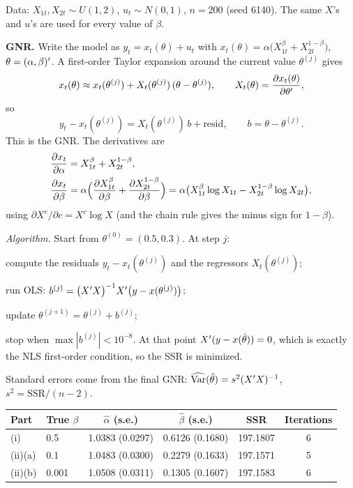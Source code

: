 \documentclass[11pt]{article}
\begin{document}

Data: $X_{1t},X_{2t}\sim U(1,2)$, $u_t\sim N(0,1)$, $n=200$ (seed 6140).
The same $X$'s and $u$'s are used for every value of $\beta$.

\textbf{GNR.} Write the model as $y_t=x_t(\theta)+u_t$ with $x_t(\theta)=\alpha\bigl(X_{1t}^{\beta}+X_{2t}^{1-\beta}\bigr)$,
$\theta=(\alpha,\beta)^{\prime}$. A first-order Taylor expansion around the current value $\theta^{(j)}$ gives
\[
  x_t(\theta)\approx x_t(\theta^{(j)})+X_t(\theta^{(j)})\,(\theta-\theta^{(j)}),
  \qquad X_t(\theta)=\frac{\partial x_t(\theta)}{\partial\theta^{\prime}},
\]
so
\[
  y_t-x_t(\theta^{(j)})=X_t(\theta^{(j)})\,b+\text{resid},\qquad b=\theta-\theta^{(j)} .
\]
This is the GNR. The derivatives are
\begin{align*}
  \frac{\partial x_t}{\partial\alpha}&=X_{1t}^{\beta}+X_{2t}^{1-\beta},\\
  \frac{\partial x_t}{\partial\beta}&=\alpha\Bigl(\frac{\partial X_{1t}^{\beta}}{\partial\beta}+\frac{\partial X_{2t}^{1-\beta}}{\partial\beta}\Bigr)
  =\alpha\bigl(X_{1t}^{\beta}\log X_{1t}-X_{2t}^{1-\beta}\log X_{2t}\bigr),
\end{align*}
using $\partial X^{c}/\partial c=X^{c}\log X$ (and the chain rule gives the minus sign for $1-\beta$).

\emph{Algorithm.} Start from $\theta^{(0)}=(0.5,0.3)$. At step $j$:
\begin{flatnum}
  \item compute the residuals $y_t-x_t(\theta^{(j)})$ and the regressors $X_t(\theta^{(j)})$;
  \item run OLS: $b^{(j)}=\bigl(X^{\prime} X\bigr)^{-1}X^{\prime}\bigl(y-x(\theta^{(j)})\bigr)$;
  \item update $\theta^{(j+1)}=\theta^{(j)}+b^{(j)}$;
  \item stop when $\max|b^{(j)}|<10^{-8}$. At that point $X^{\prime}(y-x(\hat\theta))=0$, which is exactly the
        NLS first-order condition, so the SSR is minimized.
\end{flatnum}
Standard errors come from the final GNR: $\widehat{\operatorname{Var}}(\hat\theta)=s^2(X^{\prime} X)^{-1}$, $s^2=\text{SSR}/(n-2)$.

\begin{center}
\begin{tabular}{llcccc}
\toprule
Part & True $\beta$ & $\hat\alpha$ (s.e.) & $\hat\beta$ (s.e.) & SSR & Iterations \\
\midrule
(i)      & 0.5   & 1.0383 (0.0297) & 0.6126 (0.1680) & 197.1807 & 6 \\
(ii)(a)  & 0.1   & 1.0483 (0.0300) & 0.2279 (0.1633) & 197.1571 & 5 \\
(ii)(b)  & 0.001 & 1.0508 (0.0311) & 0.1305 (0.1607) & 197.1583 & 6 \\
\bottomrule
\end{tabular}
\end{center}
\end{document}
